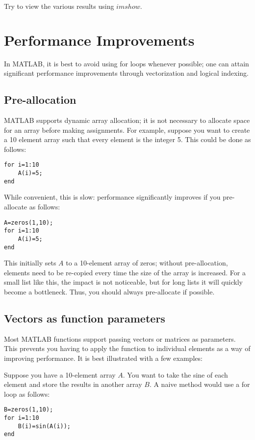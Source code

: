 \documentclass{article}
\begin{document}
Try to view the various results using \href{https://www.mathworks.com/help/matlab/ref/imshow.html}{$imshow$}.


\section{Performance Improvements}
In MATLAB, it is best to avoid using for loops whenever possible; one can attain significant performance improvements through vectorization and logical indexing.

\subsection{Pre-allocation}

MATLAB supports dynamic array allocation; it is not necessary to allocate space for an array before making assignments. For example, suppose you want to create a 10 element array such that every element is the integer 5. This could be done as follows:
\begin{lstlisting}[style=Matlab-editor]
for i=1:10
    A(i)=5;
end
\end{lstlisting}
While convenient, this is slow: performance significantly improves if you pre-allocate as follows:
\begin{lstlisting}[style=Matlab-editor]
A=zeros(1,10);
for i=1:10
    A(i)=5;
end
\end{lstlisting}

This initially sets $A$ to a 10-element array of zeros; without pre-allocation, elements need to be re-copied every time the size of the array is increased. For a small list like this, the impact is not noticeable, but for long lists it will quickly become a bottleneck. Thus, you should always pre-allocate if possible.

\subsection{Vectors as function parameters}
Most MATLAB functions support passing vectors or matrices as parameters. This prevents you having to apply the function to individual elements as a way of improving performance. It is best illustrated with a few examples:

Suppose you have a 10-element array $A$. You want to take the sine of each element and store the results in another array $B$. A naive method would use a for loop as follows:
\begin{lstlisting}[style=Matlab-editor]
B=zeros(1,10);
for i=1:10
    B(i)=sin(A(i));
end
\end{lstlisting}
\end{document}
